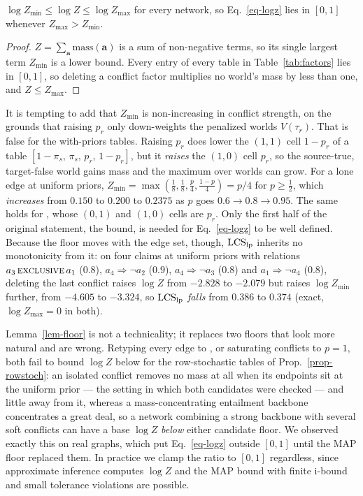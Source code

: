 \begin{lemma}
\label{lem-floor}
$\log Z_{\min}\le\log Z\le\log Z_{\max}$ for every network, so Eq.~\ref{eq-logz} lies in $[0,1]$
whenever $Z_{\max}>Z_{\min}$.
\end{lemma}
\begin{proof}
$Z=\sum_{\mathbf{a}}\mathrm{mass}(\mathbf{a})$ is a sum of non-negative terms, so its single largest
term $Z_{\min}$ is a lower bound. Every entry of every table in Table~\ref{tab:factors} lies in
$[0,1]$, so deleting a conflict factor multiplies no world's mass by less than one, and
$Z\le Z_{\max}$.
\end{proof}

\begin{remark}
\label{rem-floor}
It is tempting to add that $Z_{\min}$ is non-increasing in conflict strength, on the grounds that
raising $p_r$ only down-weights the penalized worlds $V(\tau_r)$. That is false for the with-priors
tables. Raising $p_r$ does lower the $(1,1)$ cell $1-p_r$ of a \con{} table
$[1-\pi_s,\,\pi_s,\,p_r,\,1-p_r]$, but it \emph{raises} the $(1,0)$ cell $p_r$, so the
source-true, target-false world gains mass and the maximum over worlds can grow. For a lone \con{}
edge at uniform priors, $Z_{\min}=\max(\tfrac18,\tfrac18,\tfrac{p}{4},\tfrac{1-p}{4})=p/4$ for
$p\ge\tfrac12$, which \emph{increases} from $0.150$ to $0.200$ to $0.2375$ as $p$ goes
$0.6\to0.8\to0.95$. The same holds for \exc{}, whose $(0,1)$ and $(1,0)$ cells are $p_r$. Only the
first half of the original statement, the bound, is needed for Eq.~\ref{eq-logz} to be well
defined. Because the floor moves with the edge set, though, $\mathrm{LCS}_{\mathrm{lp}}$ inherits no monotonicity
from it: on four claims at uniform priors with relations $a_3\,\textsc{exclusive}\,a_1$ ($0.8$),
$a_4\Rightarrow\neg a_2$ ($0.9$), $a_4\Rightarrow\neg a_3$ ($0.8$) and $a_1\Rightarrow\neg a_4$
($0.8$), deleting the last conflict raises $\log Z$ from $-2.828$ to $-2.079$ but raises
$\log Z_{\min}$ further, from $-4.605$ to $-3.324$, so $\mathrm{LCS}_{\mathrm{lp}}$ \emph{falls} from $0.386$ to
$0.374$ (exact, $\log Z_{\max}=0$ in both).
\end{remark}

Lemma~\ref{lem-floor} is not a technicality; it replaces two floors that look more natural and are
wrong. Retyping every edge to \con{}, or saturating conflicts to $p=1$, both fail to bound $\log Z$
below for the row-stochastic tables of Prop.~\ref{prop-rowstoch}: an isolated conflict removes no
mass at all when its endpoints sit at the uniform prior --- the setting in which both candidates were
checked --- and little away from it, whereas a mass-concentrating entailment backbone concentrates a
great deal, so a network combining a strong backbone with several soft conflicts can have a base
$\log Z$ \emph{below} either candidate floor. We observed exactly this on real graphs, which put
Eq.~\ref{eq-logz} outside $[0,1]$ until the MAP floor replaced them. In practice we clamp the ratio
to $[0,1]$ regardless, since approximate inference computes $\log Z$ and the MAP bound with finite
i-bound and small tolerance violations are possible.

